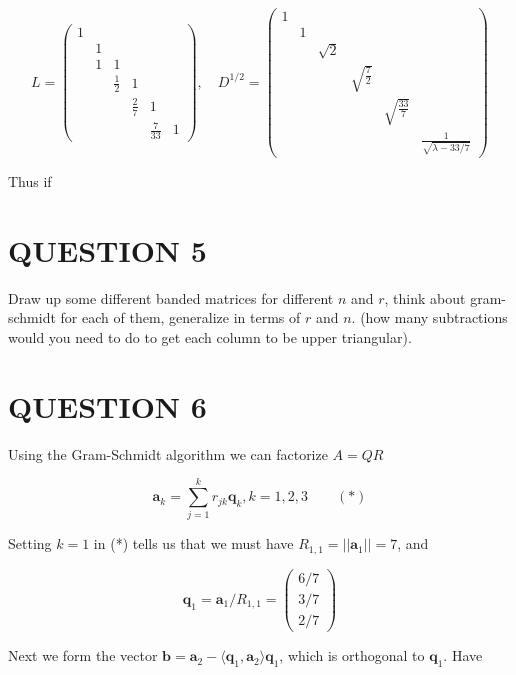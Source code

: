 \documentclass[a4paper]{article}
\begin{document}
\[ L =  \begin{pmatrix}
1 & & & & &\\
& 1 & & & & \\
& 1 & 1 & & & \\
 &  & \frac{1}{2} & 1 & & \\
 &  &  & \frac{2}{7} & 1 & \\
 &  &  &  & \frac{7}{33} & 1
\end{pmatrix}, \quad D^{1/2} = \begin{pmatrix}
1 & & & & &\\
& 1 & & & & \\
&  & \sqrt{2} & & & \\
&  &  & \sqrt{\frac{7}{2}} & & \\
&  &  &  & \sqrt{\frac{33}{7}} & \\
&  &  &  &  & \frac{1}{\sqrt{\lambda - 33/7}}
\end{pmatrix} \]

Thus if 

 


\section{QUESTION 5}

Draw up some different banded matrices for different $ n $ and $ r $, think about gram-schmidt for each of them, generalize in terms of $r $ and $ n $. (how many subtractions would you need to do to get each column to be upper triangular).

\section{QUESTION 6}

Using the Gram-Schmidt algorithm we can factorize $ A = QR $ 

\[ \mathbf{a}_{k} = \sum_{j=1}^{k} r_{jk} \mathbf{q}_{k}, k = 1,2,3 \qquad (*)  \]

Setting $ k = 1 $ in (*) tells us that we must have $ R_{1,1} = | | \mathbf{a}_{1} | | = 7 $, and

\[ \mathbf{q}_{1} = \mathbf{a}_{1} / R_{1,1} = \begin{pmatrix}
6/7\\
3/7\\
2/7
\end{pmatrix}  \] 

Next we form the vector $ \mathbf{b} = \mathbf{a}_{2} - \langle \mathbf{q}_{1},\mathbf{a}_{2} \rangle \mathbf{q}_{1}  $, which is orthogonal to $ \mathbf{q}_{1} $. Have
\end{document}
